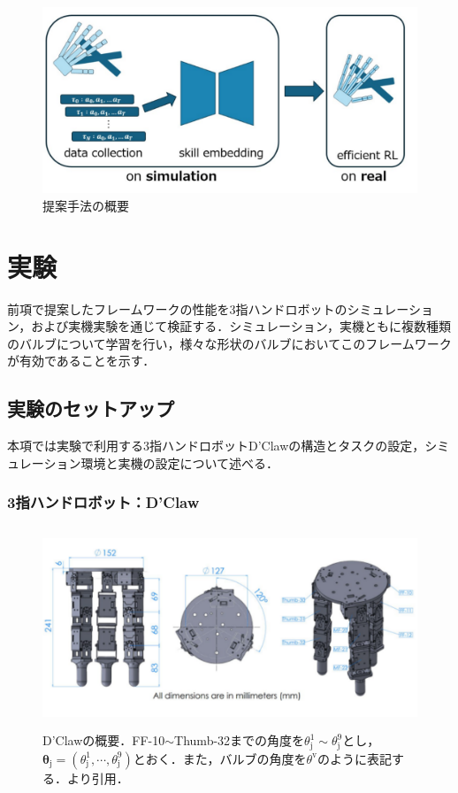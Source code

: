 \documentclass[dvipdfmx]{ampbt_nomag}
\begin{document}
\begin{figure}[hbtp]
  \centering
  \includegraphics[width=17cm]
       {asset/img/schematic_figure.pdf}
  \caption{提案手法の概要}
  \label{dclaw_structure}
\end{figure}


\section{実験}\label{sec-experiment}
前項で提案したフレームワークの性能を3指ハンドロボットのシミュレーション，および実機実験を通じて検証する．シミュレーション，実機ともに複数種類のバルブについて学習を行い，様々な形状のバルブにおいてこのフレームワークが有効であることを示す．

\subsection{実験のセットアップ}
本項では実験で利用する3指ハンドロボットD'Clawの構造とタスクの設定，シミュレーション環境と実機の設定について述べる．

\subsubsection{3指ハンドロボット：D'Claw}
\begin{figure}[hbtp]
  \centering
  \includegraphics[height=6cm]
       {asset/img/dclaw.pdf}
  \caption{D'Clawの概要．FF-10$\sim$Thumb-32までの角度を$\theta^1_{\textrm{j}}\sim\theta^9_{\textrm{j}}$とし，$\boldsymbol{\theta}_{\textrm{j}}=(\theta^1_{\textrm{j}},\cdots,\theta^9_{\textrm{j}})$とおく．また，バルブの角度を$\theta^{\textrm{v}}$のように表記する．\cite{ahn2020robel}より引用．}
  \label{dclaw_structure}
\end{figure}
 
\end{document}
